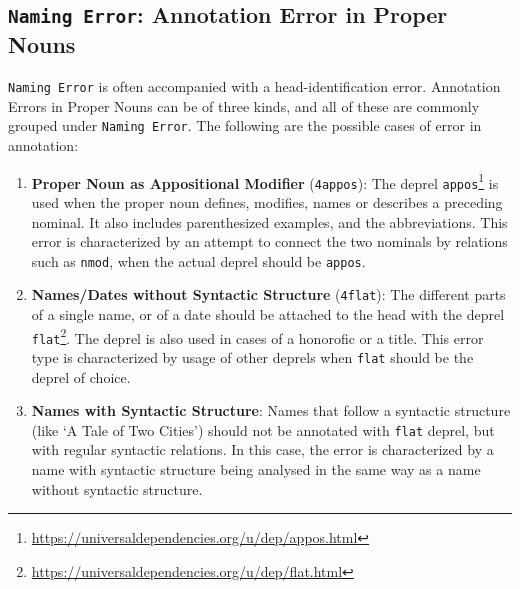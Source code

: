 \subsection[Annotation Error in Proper Nouns: \texttt{Naming Error}]{\texttt{Naming Error}: Annotation Error in Proper Nouns}

\texttt{Naming Error} is often accompanied with a head-identification error. Annotation Errors in Proper Nouns can be of three kinds, and all of these are commonly grouped under \texttt{Naming Error}. The following are the possible cases of error in annotation:

\begin{enumerate}

    \item \textbf{Proper Noun as Appositional Modifier} (\texttt{4appos}): The deprel \texttt{appos}\footnote{\url{https://universaldependencies.org/u/dep/appos.html}} is used when the proper noun defines, modifies, names or describes a preceding nominal. It also includes parenthesized examples, and the abbreviations. This error is characterized by an attempt to connect the two nominals by relations such as \texttt{nmod}, when the actual deprel should be \texttt{appos}.
    
    \item \textbf{Names/Dates without Syntactic Structure} (\texttt{4flat}): The different parts of a single name, or of a date should be attached to the head with the deprel \texttt{flat}\footnote{\url{https://universaldependencies.org/u/dep/flat.html}}. The deprel is also used in cases of a honorofic or a title. This error type is characterized by usage of other deprels when \texttt{flat} should be the deprel of choice.

    \item \textbf{Names with Syntactic Structure}: Names that follow a syntactic structure (like `A Tale of Two Cities') should not be annotated with \texttt{flat} deprel, but with regular syntactic relations. In this case, the error is characterized by a name with syntactic structure being analysed in the same way as a name without syntactic structure.
    
\end{enumerate}

